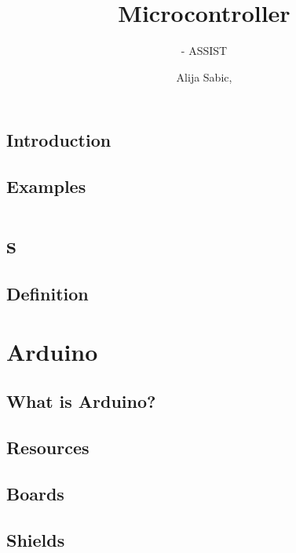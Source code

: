 \documentclass[aspectratio=169]{beamer}
\title[Microcontroller]{Microcontroller}
\subtitle{\glsentrytext{ci} - ASSIST \glsentrytext{heidi}}
\author{Alija Sabic, \glsentrytext{msc}}
\institute{Department Electronic Engineering}
\begin{document}
\begin{frame}[plain]
    \titlepage
\end{frame}

\section{}

\subsection{Introduction}

\subsection{Examples}


\section{s}

\subsection{Definition}


\subsection{}


\section{Arduino\textregistered{}}

\subsection{What is Arduino?}

\subsection{Resources}

\subsection{Boards}

\subsection{Shields}

\end{document}
